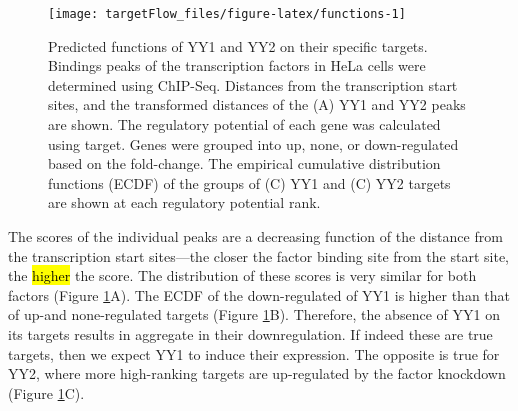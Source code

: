 \documentclass[9pt,a4paper,]{extarticle}
\newenvironment{Shaded}{\begin{snugshade}}{\end{snugshade}}
\newcommand{\AttributeTok}[1]{\textcolor[rgb]{0.77,0.63,0.00}{#1}}
\newcommand{\CommentTok}[1]{\textcolor[rgb]{0.56,0.35,0.01}{\textit{#1}}}
\newcommand{\ControlFlowTok}[1]{\textcolor[rgb]{0.13,0.29,0.53}{\textbf{#1}}}
\newcommand{\FunctionTok}[1]{\textcolor[rgb]{0.00,0.00,0.00}{#1}}
\newcommand{\NormalTok}[1]{#1}
\newcommand{\SpecialCharTok}[1]{\textcolor[rgb]{0.00,0.00,0.00}{#1}}
\newcommand{\StringTok}[1]{\textcolor[rgb]{0.31,0.60,0.02}{#1}}
\begin{document}
\begin{Shaded}
\end{Shaded}

\begin{figure}

{\centering \texttt{[image: targetFlow\_files/figure-latex/functions-1]} 

}

\caption{Predicted functions of YY1 and YY2 on their specific targets. Bindings peaks of the transcription factors in HeLa cells were determined using ChIP-Seq. Distances from the transcription start sites, and the transformed distances of the (A) YY1 and YY2 peaks are shown. The regulatory potential of each gene was calculated using target. Genes were grouped into up, none, or down-regulated based on the fold-change. The empirical cumulative distribution functions (ECDF) of the groups of (C) YY1 and (C) YY2 targets are shown at each regulatory potential rank.}\label{fig:functions}
\end{figure}

The scores of the individual peaks are a decreasing function of the distance from the transcription start sites---the closer the factor binding site from the start site, the \hl{higher} the score. The distribution of these scores is very similar for both factors (Figure \ref{fig:functions}A). The ECDF of the down-regulated of YY1 is higher than that of up-and none-regulated targets (Figure \ref{fig:functions}B). Therefore, the absence of YY1 on its targets results in aggregate in their downregulation. If indeed these are true targets, then we expect YY1 to induce their expression. The opposite is true for YY2, where more high-ranking targets are up-regulated by the factor knockdown (Figure \ref{fig:functions}C).
\end{document}
